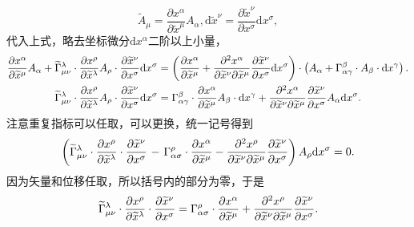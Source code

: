 \documentclass[11pt, a4paper, oneside, onecolumn]{ctexart}
\numberwithin{equation}{subsection}
\begin{document}
\begin{equation}
\widetilde{A}_{\mu}=\frac{\partial{}x^{\alpha}}{\partial{}\widetilde{x}^{\mu}}A_{\alpha},\mathrm{d}\widetilde{x}^{\nu}=\frac{\partial{}\widetilde{x}^{\nu}}{\partial{}x^{\sigma}}\mathrm{d}x^{\sigma},
\end{equation}
代入上式，略去坐标微分$\mathrm{d}x^{\alpha}$二阶以上小量，
\begin{align}
\frac{\partial{}x^{\alpha}}{\partial{}\widetilde{x}^{\mu}}A_{\alpha}+\widetilde{\Gamma}_{\mu\nu}^{\lambda}\cdot\frac{\partial{}x^{\rho}}{\partial{}\widetilde{x}^{\lambda}}A_{\rho}\cdot\frac{\partial{}\widetilde{x}^{\nu}}{\partial{}x^{\sigma}}\mathrm{d}x^{\sigma}&=\left(\frac{\partial{}x^{\alpha}}{\partial{}\widetilde{x}^{\mu}}+\frac{\partial{}^{2}x^{\alpha}}{\partial{}\widetilde{x}^{\nu}\partial{}\widetilde{x}^{\mu}}\frac{\partial{}\widetilde{x}^{\nu}}{\partial{}x^{\sigma}}\mathrm{d}x^{\sigma}\right)\cdot\left(A_{\alpha}+\Gamma_{\alpha\gamma}^{\beta}\cdot A_{\beta}\cdot\mathrm{d}x^{\gamma}\right).\notag\\
\widetilde{\Gamma}_{\mu\nu}^{\lambda}\cdot\frac{\partial{}x^{\rho}}{\partial{}\widetilde{x}^{\lambda}}A_{\rho}\cdot\frac{\partial{}\widetilde{x}^{\nu}}{\partial{}x^{\sigma}}\mathrm{d}x^{\sigma}&=\Gamma_{\alpha\gamma}^{\beta}\cdot\frac{\partial{}x^{\alpha}}{\partial{}\widetilde{x}^{\mu}}A_{\beta}\cdot\mathrm{d}x^{\gamma}+\frac{\partial{}^{2}x^{\alpha}}{\partial{}\widetilde{x}^{\nu}\partial{}\widetilde{x}^{\mu}}\frac{\partial{}\widetilde{x}^{\nu}}{\partial{}x^{\sigma}}A_{\alpha}\mathrm{d}x^{\sigma}.\notag
\end{align}
注意重复指标可以任取，可以更换，统一记号得到
\begin{equation}
\left(\widetilde{\Gamma}_{\mu\nu}^{\lambda}\cdot\frac{\partial{}x^{\rho}}{\partial{}\widetilde{x}^{\lambda}}\cdot\frac{\partial{}\widetilde{x}^{\nu}}{\partial{}x^{\sigma}}\right.-\left.\Gamma_{\alpha\sigma}^{\rho}\cdot\frac{\partial{}x^{\alpha}}{\partial{}\widetilde{x}^{\mu}}-\frac{\partial{}^{2}x^{\rho}}{\partial{}\widetilde{x}^{\nu}\partial{}\widetilde{x}^{\mu}}\frac{\partial{}\widetilde{x}^{\nu}}{\partial{}x^{\sigma}}\right)A_{\rho}\mathrm{d}x^{\sigma}=0.\notag
\end{equation}
因为矢量和位移任取，所以括号内的部分为零，于是
\begin{equation}
\widetilde{\Gamma}_{\mu\nu}^{\lambda}\cdot\frac{\partial{}x^{\rho}}{\partial{}\widetilde{x}^{\lambda}}\cdot\frac{\partial{}\widetilde{x}^{\nu}}{\partial{}x^{\sigma}}=\Gamma_{\alpha\sigma}^{\rho}\cdot\frac{\partial{}x^{\alpha}}{\partial{}\widetilde{x}^{\mu}}+\frac{\partial{}^{2}x^{\rho}}{\partial{}\widetilde{x}^{\nu}\partial{}\widetilde{x}^{\mu}}\frac{\partial{}\widetilde{x}^{\nu}}{\partial{}x^{\sigma}}.\notag
\end{equation}
\end{document}
